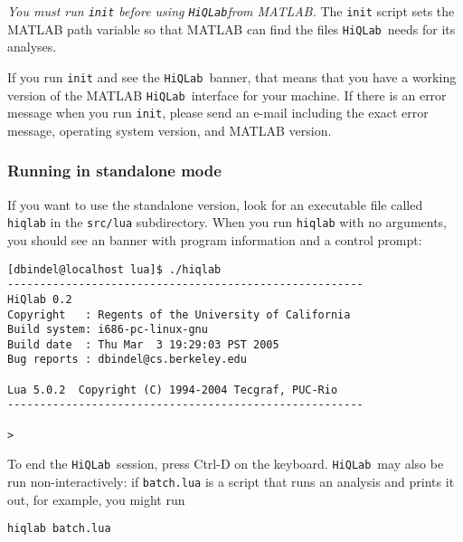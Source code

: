 \documentclass{article}
\newcommand{\hiq}{\texttt{HiQLab}}
\newcommand{\ttt}[1]{\texttt{#1}}
\begin{document}
\emph{You must run \ttt{init} before using \hiq from MATLAB.}  The
\ttt{init} script sets the MATLAB path variable so that MATLAB can
find the files \hiq\ needs for its analyses.

If you run \ttt{init} and see the \hiq\ banner, that means that you
have a working version of the MATLAB \hiq\ interface for your
machine.  If there is an error message when you run \ttt{init},
please send an e-mail including the exact error message, operating
system version, and MATLAB version.


\subsubsection{Running in standalone mode}

If you want to use the standalone version, look for an executable file
called \ttt{hiqlab} in the \ttt{src/lua} subdirectory.  When you
run \ttt{hiqlab} with no arguments, you should see an banner with
program information and a control prompt:
\begin{verbatim}
[dbindel@localhost lua]$ ./hiqlab
-------------------------------------------------------
HiQlab 0.2
Copyright   : Regents of the University of California
Build system: i686-pc-linux-gnu
Build date  : Thu Mar  3 19:29:03 PST 2005
Bug reports : dbindel@cs.berkeley.edu
 
Lua 5.0.2  Copyright (C) 1994-2004 Tecgraf, PUC-Rio
-------------------------------------------------------
 
>
\end{verbatim}%
To end the \hiq\ session, press Ctrl-D on the keyboard.  \hiq\ may
also be run non-interactively: if \ttt{batch.lua} is a script that
runs an analysis and prints it out, for example, you might run
\begin{verbatim}
hiqlab batch.lua
\end{verbatim}
\end{document}
